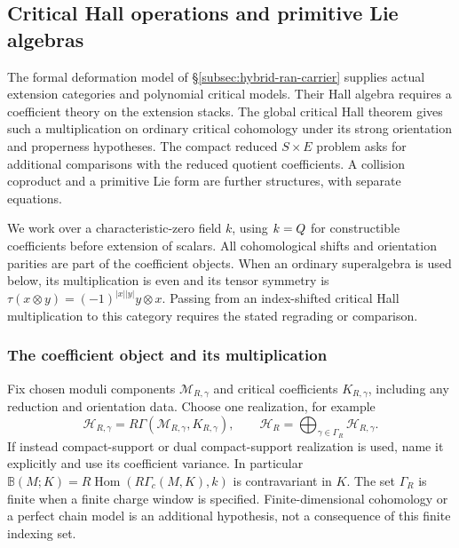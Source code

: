 \subsection{Critical Hall operations and primitive Lie algebras}
\label{subsec:hall-correspondences}

The formal deformation model of
\S\ref{subsec:hybrid-ran-carrier} supplies actual extension
categories and polynomial critical models. Their Hall algebra
requires a coefficient theory on the extension stacks.
The global critical Hall theorem gives such a multiplication on
ordinary critical cohomology under its strong orientation and
properness hypotheses. The compact reduced $S\times E$ problem
asks for additional comparisons with the reduced quotient
coefficients. A collision coproduct and a primitive Lie form are
further structures, with separate equations.

We work over a characteristic-zero field $k$, using $k=Q$ for
constructible coefficients before extension of scalars. All
cohomological shifts and orientation parities are part of the
coefficient objects. When an ordinary superalgebra is used below,
its multiplication is even and its tensor symmetry is
$\tau(x\otimes y)=(-1)^{|x||y|}y\otimes x$.
Passing from an index-shifted critical Hall multiplication to this
category requires the stated regrading or comparison.

\subsubsection*{The coefficient object and its multiplication}

\begin{definition}
\label{def:finite-geometric-hall-object}
Fix chosen moduli components $\mathcal M_{R,\gamma}$ and critical
coefficients $K_{R,\gamma}$, including any reduction and orientation
data. Choose one realization, for example
\[
 \mathcal H_{R,\gamma}=R\Gamma(\mathcal M_{R,\gamma},K_{R,\gamma}),
 \qquad
 \mathcal H_R=\bigoplus_{\gamma\in\Gamma_R}\mathcal H_{R,\gamma}.
\]
If instead compact-support or dual compact-support realization is
used, name it explicitly and use its coefficient variance. In
particular
$\mathbb B(M;K)=R\operatorname{Hom}(R\Gamma_c(M,K),k)$
is contravariant in $K$.
The set $\Gamma_R$ is finite when a finite charge window is
specified. Finite-dimensional cohomology or a perfect chain
model is an additional hypothesis, not a consequence of this
finite indexing set.
\end{definition}

